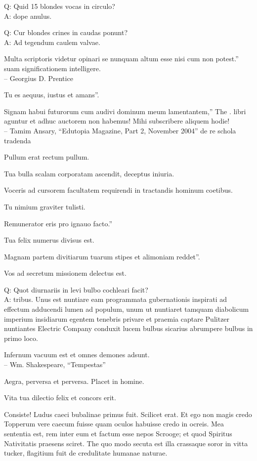 \documentclass[titlepage,12pt]{memoir}
\begin{document}
Q: Quid 15 blondes vocas in circulo?\\
A: dope anulus.

Q: Cur blondes crines in caudas ponunt?\\
A: Ad tegendum caulem valvae.

Multa scriptoris videtur opinari se nunquam altum esse nisi cum non potest.”
suam significationem intelligere.
\\-- Georgius D. Prentice

Tu es aequus, iustus et amans”.

Signam habui futurorum cum audivi dominum meum lamentantem,” The .
libri aguntur et adhuc auctorem non habemus! Mihi subscribere aliquem
hodie!
\\-- Tamim Ansary, “Edutopia Magazine, Part 2, November 2004”
de re schola tradenda

Pullum erat rectum pullum.

Tua bulla scalam corporatam ascendit, deceptus iniuria.

Voceris ad cursorem facultatem requirendi in tractandis hominum coetibus.

Tu nimium graviter tulisti.

Remunerator eris pro ignauo facto.”

Tua felix numerus divisus est.

Magnam partem divitiarum tuarum stipes et alimoniam reddet”.

Vos ad secretum missionem delectus est.

Q: Quot diurnariis in levi bulbo cochleari facit?\\
A: tribus. Unus est nuntiare eam programmata gubernationis inspirati ad effectum adducendi
lumen ad populum, unum ut nuntiaret tamquam diabolicum imperium insidiarum
egentem tenebris privare et praemia captare Pulitzer
nuntiantes Electric Company conduxit lucem bulbus sicarius abrumpere
bulbus in primo loco.

Infernum vacuum est et omnes demones adsunt.
\\-- Wm. Shakespeare, “Tempestas”

Aegra, perversa et perversa. Placet in homine.

Vita tua dilectio felix et concors erit.

Consiste! Ludus caeci bubalinae primus fuit. Scilicet erat.
Et ego non magis credo Topperum vere caecum fuisse quam oculos habuisse credo
in ocreis. Mea sententia est, rem inter eum et factum esse
nepos Scrooge; et quod Spiritus Nativitatis praesens sciret. The
quo modo secuta est illa crassaque soror in vitta tucker, flagitium fuit
de credulitate humanae naturae.
\end{document}
